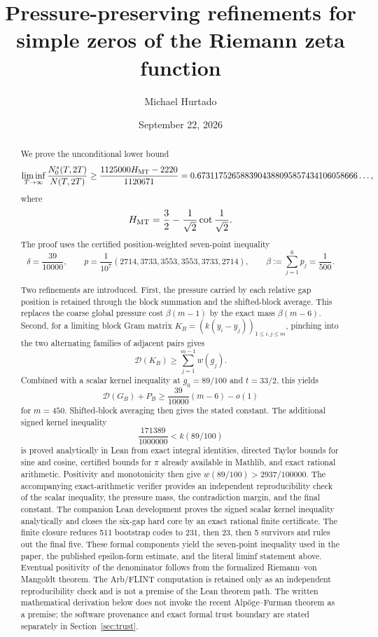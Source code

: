 \documentclass[11pt]{article}
\title{Pressure-preserving refinements for simple zeros of the Riemann zeta function}
\author{Michael Hurtado}
\date{September 22, 2026}
\begin{document}
\maketitle

\begin{abstract}
We prove the unconditional lower bound
\[
 \liminf_{T\to\infty}\frac{N_0^s(T,2T)}{N(T,2T)}
 \ge
 \frac{1125000H_{\rm MT}-2220}{1120671}
 =
 0.6731175265883904388095857434106058666\ldots,
\]
where
\[
 H_{\rm MT}
 =
 \frac32-\frac1{\sqrt2}\cot\frac1{\sqrt2}.
\]
The proof uses the certified position-weighted seven-point inequality
\[
 \delta=\frac{39}{10000},
 \qquad
 p=\frac1{10^7}(2714,3733,3553,3553,3733,2714),
 \qquad
 \beta:=\sum_{j=1}^6p_j=\frac1{500}.
\]

Two refinements are introduced.  First, the pressure carried by each relative
gap position is retained through the block summation and the shifted-block
average.  This replaces the coarse global pressure cost
\(\beta(m-1)\) by the exact mass \(\beta(m-6)\).  Second, for a limiting block Gram matrix
$K_B=(k(y_i-y_j))_{1\le i,j\le m}$, pinching into the two alternating
families of adjacent pairs gives
\[
 \mathcal D(K_B)\ge\sum_{j=1}^{m-1}w(g_j).
\]
Combined with a scalar kernel inequality at
\(g_0=89/100\) and \(t=33/2\), this yields
\[
 \mathcal D(G_B)+P_B
 \ge \frac{39}{10000}(m-6)-o(1)
\]
for \(m=450\).  Shifted-block averaging then gives the stated constant.
The additional signed kernel inequality
\[
 \frac{171389}{1000000}<k(89/100)
\]
is proved analytically in Lean from exact integral identities, directed Taylor
bounds for sine and cosine, certified bounds for \(\pi\) already available in
Mathlib, and exact rational arithmetic.  Positivity and monotonicity then give
\(w(89/100)>2937/100000\).  The accompanying exact-arithmetic verifier provides an independent
reproducibility check of the scalar inequality, the pressure mass, the
contradiction margin, and the final constant.  The companion Lean development
proves the signed scalar kernel inequality analytically and closes the six-gap
hard core by an exact rational finite certificate.  The finite closure reduces
511 bootstrap codes to 231, then 23, then 5 survivors and rules out the final
five.  These formal components yield the seven-point inequality used in the
paper, the published epsilon-form estimate, and the literal liminf statement
above.  Eventual positivity of the denominator follows from the formalized
Riemann--von Mangoldt theorem.  The Arb/FLINT computation is retained only as
an independent reproducibility check and is not a premise of the Lean theorem
path.  The written mathematical derivation below does not invoke the recent
Alpöge--Furman theorem as a premise; the software provenance and exact formal
trust boundary are stated separately in Section~\ref{sec:trust}.
\end{abstract}
\end{document}
